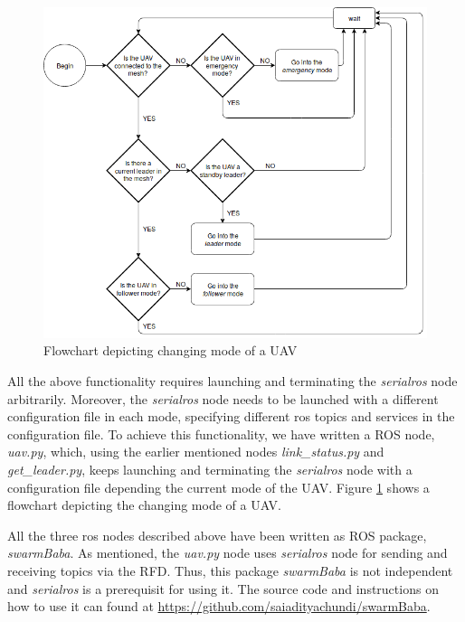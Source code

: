 \begin{figure}[h]
	\centering
	\includegraphics[scale=0.6]{Pictures/modeFlowChart.png}
	\caption{Flowchart depicting changing mode of a UAV}
	\label{fig: modeFlowChart}
\end{figure}

All the above functionality requires launching and terminating the \textit{serialros} node arbitrarily. Moreover, the \textit{serialros} node needs to be launched with a different configuration file in each mode, specifying different ros topics and services in the configuration file. To achieve this functionality, we have written a ROS node, \textit{uav.py}, which, using the earlier mentioned nodes \textit{link\_status.py} and \textit{get\_leader.py}, keeps launching and terminating the \textit{serialros} node with a configuration file depending the current mode of the UAV. Figure \ref{fig: modeFlowChart} shows a flowchart depicting the changing mode of a UAV.

All the three ros nodes described above have been written as ROS package, \textit{swarmBaba}. As mentioned, the \textit{uav.py} node uses \textit{serialros} node for sending and receiving topics via the RFD. Thus, this package \textit{swarmBaba} is not independent and \textit{serialros} is a prerequisit for using it. The source code and instructions on how to use it can found at \url{https://github.com/saiadityachundi/swarmBaba}.

